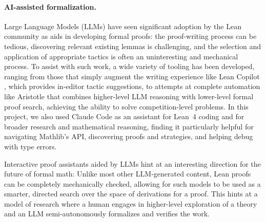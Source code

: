 \documentclass{article}
\begin{document}
\paragraph{AI-assisted formalization.}
Large Language Models (LLMs) have seen significant adoption by the Lean community as aids in
developing formal proofs: the proof-writing process can be tedious, discovering relevant existing
lemmas is challenging, and the selection and application of appropriate tactics is often an uninteresting and mechanical process.
To assist with such work, a wide variety of tooling has been developed, ranging from those that
simply augment the writing experience like Lean Copilot \cite{song2024leancopilot}, which provides
in-editor tactic suggestions, to attempts at complete automation like Aristotle
\cite{achim2025aristotle} that combines higher-level LLM reasoning with lower-level formal proof
search, achieving the ability to solve competition-level problems.
In this project, we also used Claude Code as an assistant for Lean~4 coding and for broader research and mathematical reasoning, finding it particularly helpful for navigating Mathlib's API, discovering proofs and strategies, and helping debug with type errors.

Interactive proof assistants aided by LLMs hint at an interesting direction for the future of
formal math:
Unlike most other LLM-generated content, Lean proofs can be completely mechanically checked,
allowing for such models to be used as a smarter, directed search over the space of derivations
for a proof. This hints at a model of research where a human engages in higher-level exploration
of a theory and an LLM semi-autonomously formalizes and verifies the work.

\newpage
\appendix
{}

\newpage
{}


\newpage


\end{document}
